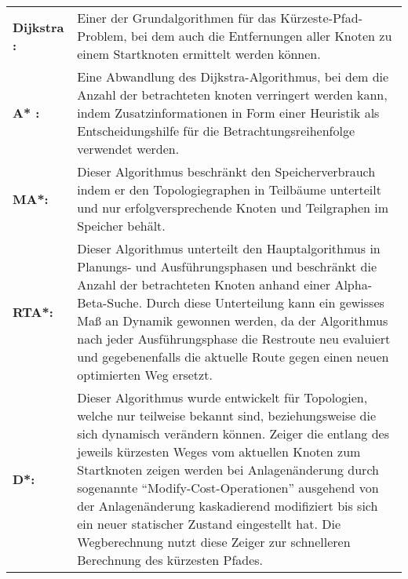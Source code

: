 		\begin{longtable}{p{2.5cm} p{10cm}}
			
			\textbf{Dijkstra :} & Einer der Grundalgorithmen für das Kürzeste-Pfad-Problem, bei dem auch die Entfernungen aller Knoten zu einem Startknoten ermittelt werden können.\\[0.5cm]
			\textbf{A* :} & Eine Abwandlung des Dijkstra-Algorithmus, bei dem die Anzahl der betrachteten knoten verringert werden kann, indem Zusatzinformationen in Form einer Heuristik als Entscheidungshilfe für die Betrachtungsreihenfolge verwendet werden.\\[0.5cm]
			\textbf{\ac{MA*}\cite{Chakrabarti1989}:} &	Dieser Algorithmus beschränkt den Speicherverbrauch indem er den Topologiegraphen in Teilbäume unterteilt und nur erfolgversprechende Knoten und Teilgraphen im Speicher behält.\\[0.5cm]
			\textbf{\ac{RTA*}\cite{Korf1990}:} & Dieser Algorithmus unterteilt den Hauptalgorithmus in  Planungs- und Ausführungsphasen und beschränkt die Anzahl der betrachteten Knoten anhand einer Alpha-Beta-Suche. Durch diese Unterteilung kann ein gewisses Maß an Dynamik gewonnen werden, da der Algorithmus nach jeder Ausführungsphase die Restroute neu evaluiert und gegebenenfalls die aktuelle Route gegen einen neuen optimierten Weg ersetzt.\\[0.5cm]
			\textbf{\ac{D*}\cite{DStarAlg}\cite{Koenig2005}:} & Dieser Algorithmus wurde entwickelt für Topologien, welche nur teilweise bekannt sind, beziehungsweise die sich dynamisch verändern können. Zeiger die entlang des jeweils kürzesten Weges vom aktuellen Knoten zum Startknoten zeigen werden bei Anlagenänderung durch sogenannte "`Modify-Cost-Operationen"' ausgehend von der Anlagenänderung kaskadierend modifiziert bis sich ein neuer statischer Zustand eingestellt hat. Die Wegberechnung nutzt diese Zeiger zur schnelleren Berechnung des kürzesten Pfades.\\[0.5cm]
			
		\end{longtable}
		
